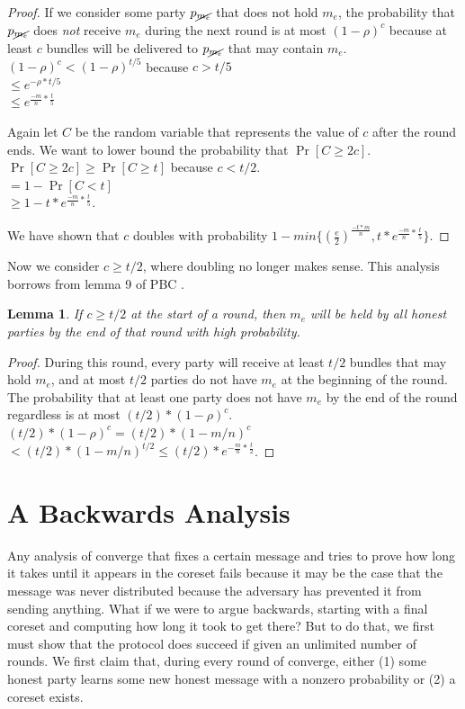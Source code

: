 \documentclass{article}
\newtheorem{lemma}{Lemma}
\begin{document}
\begin{proof}
If we consider some party $p_{\cancel{m_e}}$ that does not hold $m_e$, the probability that $p_{\cancel{m_e}}$ does \emph{not} receive $m_e$ during the next round is at most $(1 - \rho)^{c}$ because at least $c$ bundles will be delivered to $p_{\cancel{m_e}}$ that may contain $m_e$.\\
$(1 - \rho)^{c} < (1 - \rho)^{t/5}$ because $c > t/5$\\
$\leq e^{-\rho*t/5}$\\
$\leq e^{\frac{-m}{n} * \frac{t}{5}}$

Again let $C$ be the random variable that represents the value of $c$ after the round ends. We want to lower bound the probability that $\Pr[C \geq 2c]$.\\
$\Pr[C \geq 2c] \geq \Pr[C \geq t]$ because $c < t/2$.\\
$= 1 - \Pr[C < t]$\\
$\geq 1 - t*e^{\frac{-m}{n} * \frac{t}{5}}$.

We have shown that $c$ doubles with probability $1 - min\{(\frac{e}{2})^{\frac{-t*m}n} , t*e^{\frac{-m}{n} * \frac{t}{5}}\}$.
\end{proof}

Now we consider $c \geq t/2$, where doubling no longer makes sense. This analysis borrows from lemma 9 of PBC \cite{PBC}.
\begin{lemma}
If $c \geq t/2$ at the start of a round, then $m_e$ will be held by all honest parties by the end of that round with high probability.
\end{lemma}
\begin{proof}
During this round, every party will receive at least $t/2$ bundles that may hold $m_e$, and at most $t/2$ parties do not have $m_e$ at the beginning of the round. The probability that at least one party does not have $m_e$ by the end of the round regardless is at most $(t/2) * (1 - \rho)^c$.\\
 $(t/2) * (1 - \rho)^c = (t/2) * (1 - m/n)^c$\\
 $< (t/2) * (1 - m/n)^{t/2} \leq (t/2) * e^{-\frac m n * \frac t 2}$.
\end{proof}

\section{A Backwards Analysis}
Any analysis of converge that fixes a certain message and tries to prove how long it takes until it appears in the coreset fails because it may be the case that the message was never distributed because the adversary has prevented it from sending anything. What if we were to argue backwards, starting with a final coreset and computing how long it took to get there? But to do that, we first must show that the protocol does succeed if given an unlimited number of rounds. We first claim that, during every round of converge, either (1) some honest party learns some new honest message with a nonzero probability or (2) a coreset exists.
\end{document}
